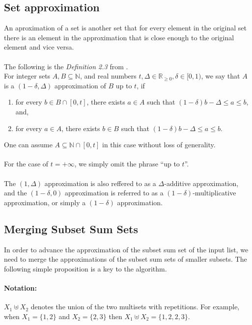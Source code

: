 \subsection{Set approximation}
An aproximation of a set is another set that for every element in the original set there is an element in the approximation that is close enough to the original element and vice versa. \\ \\
The following is the \textit{Definition 2.3} from \cite{deng}. \\
For integer sets \(A, B \subseteq \mathbb{N}\), and real numbers \(t, \Delta \in \mathbb{R}_{\geq 0}, \delta \in [0, 1)\), we say that \(A\) is a \((1 - \delta, \Delta)\) approximation of \(B\) up to \(t\), if
\begin{enumerate}
    \item for every \(b \in B \cap [0, t]\), there exists \(a \in A\) such that \((1 - \delta)b - \Delta \leq a \leq b\), and,
    \item for every \(a \in A\), there exists \(b \in B\) such that \((1 - \delta)b - \Delta \leq a \leq b\).
\end{enumerate}
One can assume \(A \subseteq \mathbb{N} \cap [0, t]\) in this case without loss of generality.
\\ \\
For the case of \(t = +\infty\), we simply omit the phrase “up to \(t\)”.
\\ \\
The \((1, \Delta)\) approximation is also reffered to as a \(\Delta\)-additive approximation, and the \((1 - \delta, 0)\) approximation is referred to as a \((1 - \delta)\)-multiplicative approximation, or simply a \((1 - \delta)\) approximation.\\


\subsection{Merging Subset Sum Sets}

In order to advance the approximation of the subset sum set of the input list, we need to merge the approximations of the subset sum sets of smaller subsets. The following simple proposition is a key to the algorithm.

\paragraph{Notation:}
\(X_1 \uplus X_2\) denotes the union of the two multisets with repetitions. For example, when \(X_1 = \{1, 2\}\) and \(X_2 = \{2, 3\}\) then \(X_1 \uplus X_2 = \{1, 2, 2, 3\}\).


